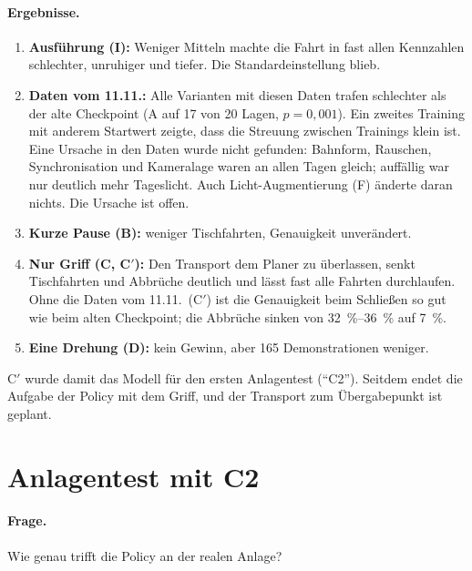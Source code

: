 \paragraph{Ergebnisse.}
\begin{enumerate}
  \item \textbf{Ausführung (I):} Weniger Mitteln machte die Fahrt in fast allen Kennzahlen
    schlechter, unruhiger und tiefer. Die Standardeinstellung blieb.
  \item \textbf{Daten vom 11.11.:} Alle Varianten mit diesen Daten trafen schlechter als der
    alte Checkpoint (A auf 17 von 20 Lagen, $p = 0{,}001$). Ein zweites Training mit anderem
    Startwert zeigte, dass die Streuung zwischen Trainings klein ist. Eine Ursache in den Daten
    wurde nicht gefunden: Bahnform, Rauschen, Synchronisation und Kameralage waren an allen
    Tagen gleich; auffällig war nur deutlich mehr Tageslicht. Auch Licht-Augmentierung (F)
    änderte daran nichts. Die Ursache ist offen.
  \item \textbf{Kurze Pause (B):} weniger Tischfahrten, Genauigkeit unverändert.
  \item \textbf{Nur Griff (C, C$'$):} Den Transport dem Planer zu überlassen, senkt
    Tischfahrten und Abbrüche deutlich und lässt fast alle Fahrten durchlaufen. Ohne die
    Daten vom 11.11.\ (C$'$) ist die Genauigkeit beim Schließen so gut wie beim alten
    Checkpoint; die Abbrüche sinken von \SIrange{32}{36}{\percent} auf \SI{7}{\percent}.
  \item \textbf{Eine Drehung (D):} kein Gewinn, aber 165 Demonstrationen weniger.
\end{enumerate}
C$'$ wurde damit das Modell für den ersten Anlagentest (\enquote{C2}). Seitdem endet die
Aufgabe der Policy mit dem Griff, und der Transport zum Übergabepunkt ist geplant.


\section{Anlagentest mit C2}
\label{sec:anlagentest-c2}

\paragraph{Frage.} Wie genau trifft die Policy an der realen Anlage?

